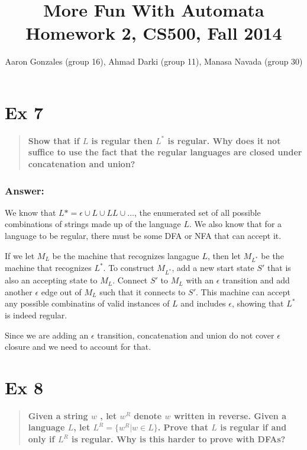 \documentclass[titlepage]{article}\usepackage[]{graphicx}\usepackage[]{color}
\begin{document}
\title{More Fun With Automata \\ Homework 2, CS500, Fall 2014}
\author{Aaron Gonzales (group 16), Ahmad Darki (group 11), Manasa Navada (group
30) }
\maketitle


\section*{Ex 7}
\begin{quote}
  \textbf{Show that if $L$ is regular then $L^*$ is regular. Why does it not suffice
  to use the fact that the regular languages are closed under concatenation and
  union?}
\end{quote}
\subsubsection*{Answer:}
We know that $L* = \epsilon \cup L \cup LL \cup \dots$, the enumerated set of
all possible combinations of strings made up of the language $L$. We also know
that for a language to be regular, there must be some DFA or NFA that can
accept it. 

If we let $M_L$ be the machine that recognizes langague $L$, then let $M_{L^*}$
be the machine that recognizes $L^*$. To construct $M_{L^*}$, add a new start
state $S'$ that is also an accepting state to $M_L$. Connect $S'$ to $M_L$ with
an $\epsilon$ transition and add another $\epsilon$ edge out of $M_L$ such that
it connects to $S'$. This machine can accept any possible combinatins of valid
instances of $L$ and includes $\epsilon$, showing that $L^*$ is indeed regular. 

Since we are adding an $\epsilon$ transition, concatenation and union do not
cover $\epsilon$ closure and we need to account for that.



\section*{Ex 8}
\begin{quote}
  \textbf{Given a string $w$ , let $w^R$ denote $w$ written in reverse.
    Given a language $L$, let $L^R = \{w^R | w \in L \}$. Prove that $L$ is regular if and
    only if $L^R$ is regular. Why is this harder to prove with DFAs?}
\end{quote}
\end{document}
